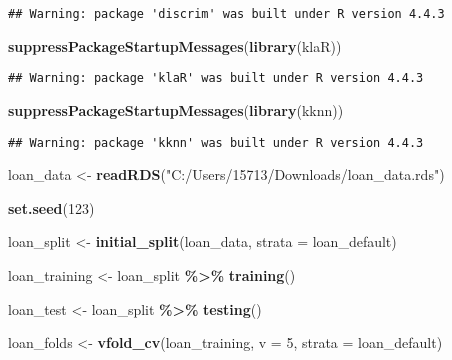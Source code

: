 \documentclass[
]{article}
\newenvironment{Shaded}{\begin{snugshade}}{\end{snugshade}}
\newcommand{\AttributeTok}[1]{\textcolor[rgb]{0.13,0.29,0.53}{#1}}
\newcommand{\DecValTok}[1]{\textcolor[rgb]{0.00,0.00,0.81}{#1}}
\newcommand{\FunctionTok}[1]{\textcolor[rgb]{0.13,0.29,0.53}{\textbf{#1}}}
\newcommand{\NormalTok}[1]{#1}
\newcommand{\OtherTok}[1]{\textcolor[rgb]{0.56,0.35,0.01}{#1}}
\newcommand{\SpecialCharTok}[1]{\textcolor[rgb]{0.81,0.36,0.00}{\textbf{#1}}}
\newcommand{\StringTok}[1]{\textcolor[rgb]{0.31,0.60,0.02}{#1}}
\begin{document}
\begin{verbatim}
## Warning: package 'discrim' was built under R version 4.4.3
\end{verbatim}

\begin{Shaded}
\begin{Highlighting}[]
\FunctionTok{suppressPackageStartupMessages}\NormalTok{(}\FunctionTok{library}\NormalTok{(klaR))}
\end{Highlighting}
\end{Shaded}

\begin{verbatim}
## Warning: package 'klaR' was built under R version 4.4.3
\end{verbatim}

\begin{Shaded}
\begin{Highlighting}[]
\FunctionTok{suppressPackageStartupMessages}\NormalTok{(}\FunctionTok{library}\NormalTok{(kknn))}
\end{Highlighting}
\end{Shaded}

\begin{verbatim}
## Warning: package 'kknn' was built under R version 4.4.3
\end{verbatim}

\begin{Shaded}
\begin{Highlighting}[]
\NormalTok{loan\_data }\OtherTok{\textless{}{-}} \FunctionTok{readRDS}\NormalTok{(}\StringTok{"C:/Users/15713/Downloads/loan\_data.rds"}\NormalTok{)}

\FunctionTok{set.seed}\NormalTok{(}\DecValTok{123}\NormalTok{)}

\NormalTok{loan\_split }\OtherTok{\textless{}{-}} \FunctionTok{initial\_split}\NormalTok{(loan\_data, }\AttributeTok{strata =}\NormalTok{ loan\_default)}

\NormalTok{loan\_training }\OtherTok{\textless{}{-}}\NormalTok{ loan\_split }\SpecialCharTok{\%\textgreater{}\%} \FunctionTok{training}\NormalTok{()}

\NormalTok{loan\_test }\OtherTok{\textless{}{-}}\NormalTok{ loan\_split }\SpecialCharTok{\%\textgreater{}\%} \FunctionTok{testing}\NormalTok{()}

\NormalTok{loan\_folds }\OtherTok{\textless{}{-}} \FunctionTok{vfold\_cv}\NormalTok{(loan\_training, }\AttributeTok{v =} \DecValTok{5}\NormalTok{, }\AttributeTok{strata =}\NormalTok{ loan\_default)}
\end{Highlighting}
\end{Shaded}
\end{document}

